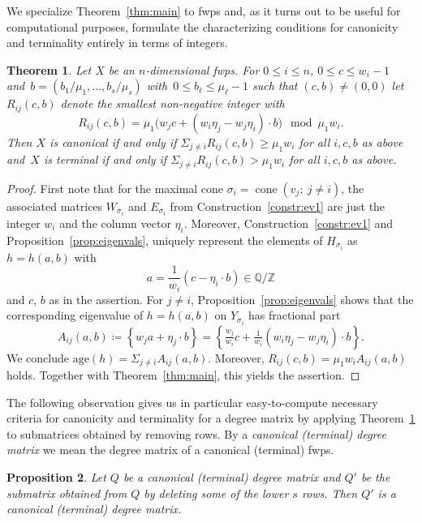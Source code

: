 \documentclass{amsart}
\newcommand{\Q}{\mathbb{Q}}
\newcommand{\Z}{\mathbb{Z}}
\DeclareMathOperator{\cone}{cone}
\newcommand{\fpart}[1]{\left\{ #1 \right\}} %
\theoremstyle{plain}
\newtheorem{theorem}{Theorem}[section]
\newtheorem{proposition}[theorem]{Proposition}
\theoremstyle{definition}
\begin{document}
We specialize Theorem~\ref{thm:main} to fwps and, as it turns out to be
useful for computational purposes, formulate the characterizing conditions
for canonicity and terminality entirely in terms of integers.

\begin{theorem}\label{thm:fwps}
Let $X$ be an $n$-dimensional fwps.
For $0 \le i \le n$, $0 \le c \le w_i-1$ and~$b=(b_1/\mu_1,\dots,b_s/\mu_s)$
with~$0\le b_\ell\le \mu_\ell-1$ such that $(c,b)\neq(0,0)$ let
$R_{ij}(c,b)$ denote the smallest non-negative integer with
$$
R_{ij}(c,b)=\mu_1\bigl(w_jc+(w_i\eta_j-w_j\eta_i)\cdot b\bigr)\mod \mu_1w_i.
$$
Then $X$ is canonical if and only if $\Sigma_{j\neq i}R_{ij}(c,b) \ge \mu_1w_i$
for all $i, c, b$ as above
and~$X$ is terminal if and only if $\Sigma_{j\neq i}R_{ij}(c,b) > \mu_1w_i$
for all $i, c, b$ as above.
\end{theorem}

\begin{proof}
First note that for the maximal cone $\sigma_i=\cone(v_j;\ j\neq i)$,
the associated matrices $W_{\sigma_i}$ and $E_{\sigma_i}$ from
Construction~\ref{constr:ev1} are just the integer $w_i$
and the column vector $\eta_i$.
Moreover, Construction~\ref{constr:ev1} and Proposition~\ref{prop:eigenvals},
uniquely represent the elements of $H_{\sigma_i}$ as $h =h(a,b)$ with
$$
a=\frac{1}{w_i}(c-\eta_i\cdot b)\in\Q/\Z
$$
and $c$, $b$ as in the assertion.
For $j \neq i$, Proposition~\ref{prop:eigenvals} shows that
the corresponding eigenvalue of $h=h(a,b)$ on $Y_{\sigma_i}$ has
fractional part
\[
A_{ij}(a,b)
\coloneqq
\fpart{w_ja+\eta_j\cdot b}
=
\fpart{\tfrac{w_j}{w_i}c+\tfrac{1}{w_i}(w_i\eta_j-w_j\eta_i)\cdot b}.
\]
We conclude $\mathrm{age}(h) = \Sigma_{j\neq i} A_{ij}(a,b)$.
Moreover, $R_{ij}(c,b)=\mu_1w_iA_{ij}(a,b)$ holds.
Together with Theorem~\ref{thm:main}, this yields the
assertion.
\end{proof}



The following observation gives us in particular easy-to-compute
necessary criteria for canonicity and terminality for a degree matrix
by applying Theorem~\ref{thm:fwps} to submatrices obtained
by removing rows.
By a \emph{canonical (terminal) degree matrix} we mean the degree
matrix of a canonical (terminal) fwps.


\begin{proposition}\label{prop:partial-rows}
Let $Q$ be a canonical (terminal) degree matrix and $Q'$ be the
submatrix obtained from $Q$ by deleting some of the lower $s$ rows.
Then $Q'$ is a canonical (terminal) degree matrix.
\end{proposition}
\end{document}
